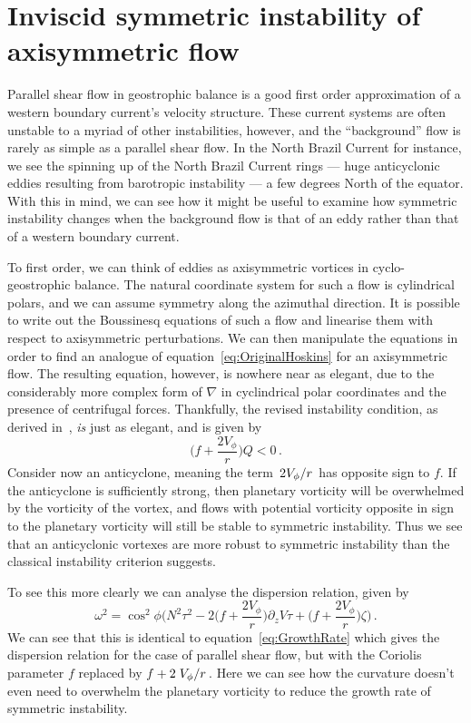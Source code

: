 \section{Inviscid symmetric instability of axisymmetric flow}
Parallel shear flow in geostrophic balance is a good first order approximation of a western boundary current's velocity structure. These current systems are often unstable to a myriad of other instabilities, however, and the ``background'' flow is rarely as simple as a parallel shear flow. In the North Brazil Current for instance, we see the spinning up of the North Brazil Current rings --- huge anticyclonic eddies resulting from barotropic instability --- a few degrees North of the equator. With this in mind, we can see how it might be useful to examine how symmetric instability changes when the background flow is that of an eddy rather than that of a western boundary current.

To first order, we can think of eddies as axisymmetric vortices in cyclo-geostrophic balance. The natural coordinate system for such a flow is cylindrical polars, and we can assume symmetry along the azimuthal direction. It is possible to write out the Boussinesq equations of such a flow and linearise them with respect to axisymmetric perturbations. We can then manipulate the equations in order to find an analogue of equation~\ref{eq:OriginalHoskins} for an axisymmetric flow. The resulting equation, however, is nowhere near as elegant, due to the considerably more complex form of $\nabla$ in cyclindrical polar coordinates and the presence of centrifugal forces\footnotemark. Thankfully, the revised instability condition, as derived in~\citet{Buckingham2021}, \textit{is} just as elegant, and is given by
\begin{equation}
    \bigg(f + \frac{2 V_\phi}{r}\bigg)Q < 0 \, .
\end{equation}
Consider now an anticyclone, meaning the term $\flatfrac{2V_\phi}{r}$ has opposite sign to $f$. If the anticyclone is sufficiently strong, then planetary vorticity will be overwhelmed by the vorticity of the vortex, and flows with potential vorticity  opposite in sign to the planetary vorticity will still be stable to symmetric instability. Thus we see that an anticyclonic vortexes are more robust to symmetric instability than the classical instability criterion suggests.

To see this more clearly we can analyse the dispersion relation, given by
\begin{equation}
    \label{eq:GrowthRateCurv}
    \omega^2 = \cos^2\phi \Bigg(N^2 \tau^2 - 2\bigg(f + \frac{2V_\phi}{r}\bigg)\partial_zV\tau + \bigg(f + \frac{2V_\phi}{r}\bigg)\zeta\Bigg) \, .
\end{equation}
We can see that this is identical to equation~\ref{eq:GrowthRate} which gives the dispersion relation for the case of parallel shear flow, but with the Coriolis parameter $f$ replaced by $f + 2 \flatfrac{V_\phi}{r}$. Here we can see how the curvature doesn't even need to overwhelm the planetary vorticity to reduce the growth rate of symmetric instability.

